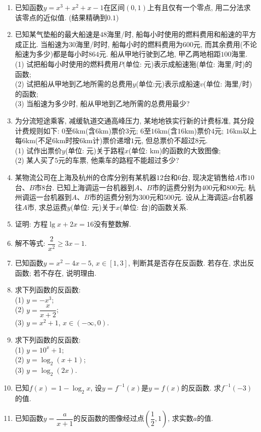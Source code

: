 \documentclass[10pt,a4paper]{article}
\begin{document}
\begin{enumerate}[1.]
\item 已知函数$y=x^3+x^2+x-1$在区间$(0, 1)$上有且仅有一个零点, 用二分法求该零点的近似值. (结果精确到$0.1$)
\item 已知某气垫船的最大船速是$48$海里/时, 船每小时使用的燃料费用和船速的平方成正比. 当船速为$30$海里/时时, 船每小时的燃料费用为$600$元, 而其余费用(不论船速为多少)都是每小时$864$元. 船从甲地行驶到乙地, 甲乙两地相距$100$海里.\\
(1) 试把船每小时使用的燃料费用$P($单位: 元)表示成船速狏(单位: 海里/时)的函数;\\
(2) 试把船从甲地到乙地所需的总费用$y$(单位:元)表示成船速$v$(单位: 海里/时)的函数;\\
(3) 当船速为多少时, 船从甲地到乙地所需的总费用最少?
\item 为分流短途乘客, 减缓轨道交通高峰压力, 某地地铁实行新的计费标准, 其分段计费规则如下: $0$至$6\text{km}$(含$6\text{km}$)票价$3$元; $6$至$16\text{km}$(含$16\text{km}$)票价$4$元; $16\text{km}$以上每$6\text{km}$(不足$6\text{km}$时按$6\text{km}$计)票价递增$1$元, 但总票价不超过$8$元.\\
(1) 试作出票价$y$(单位: 元)关于路程$x$(单位: $\text{km}$)的函数的大致图像;\\
(2) 某人买了$5$元的车票, 他乘车的路程不能超过多少?
\item 某物流公司在上海及杭州的仓库分别有某机器$12$台和$6$台, 现决定销售给$A$市$10$台、$B$市$8$台. 已知上海调运一台机器到$A$、$B$市的运费分别为$400$元和$800$元; 杭州调运一台机器到$A$、$B$市的运费分别为$300$元和$500$元. 设从上海调运$x$台机器往$A$市, 求总运费$y$(单位: 元)关于$x$(单位: 台)的函数关系.
\item 证明: 方程$\lg x+2x=16$没有整数解.
\item 解不等式: $\dfrac 2{x^2}\ge 3x-1$. 
\item 已知函数$y=x^2-4x-5$, $x\in [1, 3]$, 判断其是否存在反函数. 若存在, 求出反函数; 若不存在, 说明理由.
\item 求下列函数的反函数:\\
(1) $y=-x^3$;\\
(2) $y=\dfrac x{x+2}$;\\
(3) $y=x^2+1$, $x\in (-\infty, 0)$.
\item 求下列函数的反函数:\\
(1) $y=10^x+1$;\\
(2) $y=\log_2(x+1)$;\\
(3) $y=\log_2(2x)$.
\item 已知$f(x)=1-\log_2x$, 设$y=f^{-1}(x)$是$y=f(x)$的反函数. 求$f^{-1}(-3)$的值.
\item 已知函数$y=\dfrac a{x+1}$的反函数的图像经过点$(\dfrac 12, 1)$, 求实数$a$的值.


\end{enumerate}
\end{document}
